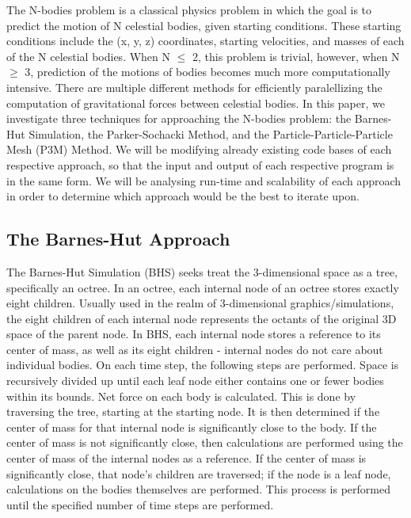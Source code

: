 \documentclass[11pt]{article}
\begin{document}
The N-bodies problem is a classical physics problem in which the goal is to predict the motion of N celestial bodies, given starting conditions. 
These starting conditions include the (x, y, z) coordinates, starting velocities, and masses of each of the N celestial bodies. When N $\le$ 2, this problem is trivial, however, when N $\ge$ 3, prediction of the motions of bodies becomes much more computationally intensive. There are multiple different methods for efficiently paralellizing the computation of gravitational forces between celestial bodies.
\newline \newline
In this paper, we investigate three techniques for approaching the N-bodies problem: the Barnes-Hut Simulation, the Parker-Sochacki Method, and the Particle-Particle-Particle Mesh (P3M) Method. We will be modifying already existing code bases of each respective approach, so that the input and output of each respective program is in the same form. We will be analysing run-time and scalability of each approach in order to determine which approach would be the best to iterate upon.
\begin{center}
\section*{The Barnes-Hut Approach}
\end{center}
The Barnes-Hut Simulation (BHS) seeks treat the 3-dimensional space as a tree, specifically an octree. In an octree, each internal node of an octree stores exactly eight children. Usually used in the realm of 3-dimensional graphics/simulations, the eight children of each internal node represents the octants of the original 3D space of the parent node. In BHS, each internal node stores a reference to its center of mass, as well as its eight children - internal nodes do not care about individual bodies. 
\newline \newline 
On each time step, the following steps are performed. Space is recursively divided up until each leaf node either contains one or fewer bodies within its bounds. Net force on each body is calculated. This is done by traversing the tree, starting at the starting node. It is then determined if the center of mass for that internal node is significantly close to the body. If the center of mass is not significantly close, then calculations are performed using the center of mass of the internal nodes as a reference. If the center of mass is significantly close, that node's children are traversed; if the node is a leaf node, calculations on the bodies themselves are performed. This process is performed until the specified number of time steps are performed.
\end{document}
